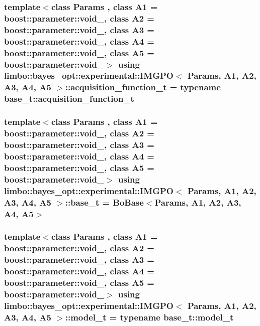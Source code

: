 \subsubsection[{\texorpdfstring{acquisition\+\_\+function\+\_\+t}{acquisition_function_t}}]{\setlength{\rightskip}{0pt plus 5cm}template$<$class Params , class A1  = boost\+::parameter\+::void\+\_\+, class A2  = boost\+::parameter\+::void\+\_\+, class A3  = boost\+::parameter\+::void\+\_\+, class A4  = boost\+::parameter\+::void\+\_\+, class A5  = boost\+::parameter\+::void\+\_\+$>$ using {\bf limbo\+::bayes\+\_\+opt\+::experimental\+::\+I\+M\+G\+PO}$<$ Params, A1, A2, A3, A4, A5 $>$\+::{\bf acquisition\+\_\+function\+\_\+t} =  typename {\bf base\+\_\+t\+::acquisition\+\_\+function\+\_\+t}}\hypertarget{classlimbo_1_1bayes__opt_1_1experimental_1_1_i_m_g_p_o_a794770d90f1ddd8efde68bad804ee5e7}{}\label{classlimbo_1_1bayes__opt_1_1experimental_1_1_i_m_g_p_o_a794770d90f1ddd8efde68bad804ee5e7}
\subsubsection[{\texorpdfstring{base\+\_\+t}{base_t}}]{\setlength{\rightskip}{0pt plus 5cm}template$<$class Params , class A1  = boost\+::parameter\+::void\+\_\+, class A2  = boost\+::parameter\+::void\+\_\+, class A3  = boost\+::parameter\+::void\+\_\+, class A4  = boost\+::parameter\+::void\+\_\+, class A5  = boost\+::parameter\+::void\+\_\+$>$ using {\bf limbo\+::bayes\+\_\+opt\+::experimental\+::\+I\+M\+G\+PO}$<$ Params, A1, A2, A3, A4, A5 $>$\+::{\bf base\+\_\+t} =  {\bf Bo\+Base}$<$Params, A1, A2, A3, A4, A5$>$}\hypertarget{classlimbo_1_1bayes__opt_1_1experimental_1_1_i_m_g_p_o_a503aab1180ed196b4cdb35befa9b741e}{}\label{classlimbo_1_1bayes__opt_1_1experimental_1_1_i_m_g_p_o_a503aab1180ed196b4cdb35befa9b741e}
\subsubsection[{\texorpdfstring{model\+\_\+t}{model_t}}]{\setlength{\rightskip}{0pt plus 5cm}template$<$class Params , class A1  = boost\+::parameter\+::void\+\_\+, class A2  = boost\+::parameter\+::void\+\_\+, class A3  = boost\+::parameter\+::void\+\_\+, class A4  = boost\+::parameter\+::void\+\_\+, class A5  = boost\+::parameter\+::void\+\_\+$>$ using {\bf limbo\+::bayes\+\_\+opt\+::experimental\+::\+I\+M\+G\+PO}$<$ Params, A1, A2, A3, A4, A5 $>$\+::{\bf model\+\_\+t} =  typename {\bf base\+\_\+t\+::model\+\_\+t}}\hypertarget{classlimbo_1_1bayes__opt_1_1experimental_1_1_i_m_g_p_o_ae1e0602bec9e133b40e2c171fca8d8de}{}\label{classlimbo_1_1bayes__opt_1_1experimental_1_1_i_m_g_p_o_ae1e0602bec9e133b40e2c171fca8d8de}


